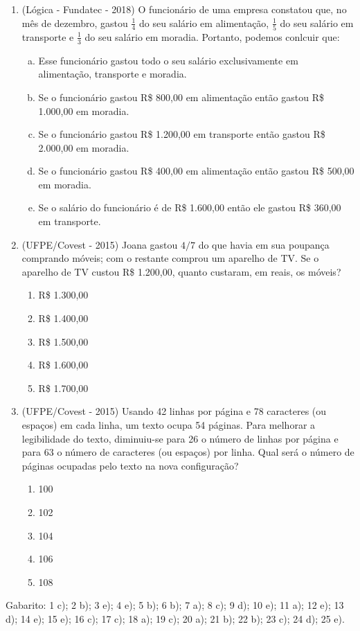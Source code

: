 \begin{enumerate}
 \item (Lógica - Fundatec - 2018) O funcionário de uma empresa constatou que, no mês de dezembro, gastou $\frac{1}{4}$ do seu salário em alimentação, $\frac{1}{5}$ do seu salário em transporte e $\frac{1}{3}$ do seu salário em moradia. Portanto, podemos conlcuir que:
\begin{enumerate}[a)]
\item Esse funcionário gastou todo o seu salário exclusivamente em alimentação, transporte e moradia.
\item Se o funcionário gastou R\$ 800,00 em alimentação então gastou R\$ 1.000,00 em moradia.
\item Se o funcionário gastou R\$ 1.200,00 em transporte então gastou R\$ 2.000,00 em moradia.
\item Se o funcionário gastou R\$ 400,00 em alimentação então gastou R\$ 500,00 em moradia.
\item Se o salário do funcionário é de R\$ 1.600,00 então ele gastou R\$ 360,00 em transporte.
\end{enumerate}

 \item (UFPE/Covest - 2015) Joana gastou $4/7$ do que havia em sua poupança comprando móveis; com o restante comprou um aparelho de TV. Se o aparelho de TV custou R\$ 1.200,00, quanto custaram, em reais, os móveis?
 \begin{enumerate}
 \item R\$ 1.300,00
 \item R\$ 1.400,00
 \item R\$ 1.500,00
 \item R\$ 1.600,00
 \item R\$ 1.700,00
 \end{enumerate}
 
 \item (UFPE/Covest - 2015) Usando 42 linhas por página e 78 caracteres (ou espaços) em cada linha, um texto ocupa 54 páginas. Para melhorar a legibilidade do texto, diminuiu-se para 26 o número de linhas por página e para 63 o número de caracteres (ou espaços) por linha. Qual será o número de páginas ocupadas pelo texto na nova configuração?
 \begin{enumerate}
 \item 100 
 \item 102
 \item 104
 \item 106
 \item 108
 \end{enumerate}

 \end{enumerate}
 
 Gabarito: 1 c); 2 b); 3 e); 4 e); 5 b); 6 b); 7 a); 8 c); 9 d); 10 e); 11 a); 12 e); 13 d); 14 e); 15 e); 16 c); 17 c); 18 a); 19 c); 20 a); 21 b); 22 b); 23 c); 24 d); 25 e).
